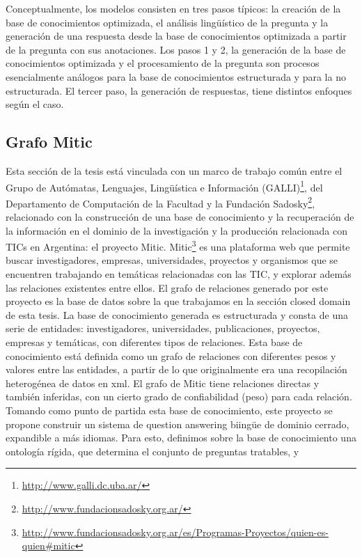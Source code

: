 Conceptualmente, los modelos consisten en tres pasos típicos: la creación de la base de conocimientos optimizada, el análisis
lingüístico de la pregunta y la generación de una respuesta desde la base de conocimientos optimizada a partir de la pregunta con sus
anotaciones. Los pasos 1 y 2, la generación de la base de conocimientos optimizada y el procesamiento de la pregunta son procesos
esencialmente análogos para la base de conocimientos estructurada y para la no estructurada. El tercer paso, la generación de respuestas,
tiene distintos enfoques según el caso. 


\subsection{Grafo Mitic}
\label{subsec:mitic}
\horrible
Esta sección de la tesis está vinculada con un marco de trabajo común entre el
Grupo de Autómatas, Lenguajes, Lingüística e Información (GALLI)\footnote{\url{http://www.galli.dc.uba.ar/}}, 
del Departamento de Computación de la Facultad y la Fundación Sadosky\footnote{\url{http://www.fundacionsadosky.org.ar/}}, relacionado con la construcción de una base de conocimiento
 y la recuperación de la información en el dominio de la investigación y la
producción relacionada con TICs en Argentina: el proyecto Mitic.
Mitic\footnote{\url{http://www.fundacionsadosky.org.ar/es/Programas-Proyectos/quien-es-quien\#mitic}} es una plataforma web que permite buscar investigadores, empresas, universidades, proyectos y organismos que se encuentren trabajando en temáticas relacionadas con las TIC, y explorar además las relaciones existentes entre ellos. El grafo de relaciones generado por este proyecto es la base de datos sobre la que trabajamos en la sección closed domain de esta tesis.
La base de conocimiento generada es estructurada y consta de
una serie de entidades: investigadores, universidades, publicaciones,
proyectos, empresas y temáticas, con diferentes tipos de relaciones.
Esta base de conocimiento está definida como un grafo de relaciones con diferentes pesos y valores entre
las entidades, a partir de lo que originalmente era una
recopilación heterogénea de datos en xml. El grafo de Mitic
tiene relaciones directas y también inferidas, con un cierto grado
de confiabilidad (peso) para cada relación. Tomando como punto de
partida esta base de conocimiento, este proyecto se propone construir
un sistema de question answering biingüe de dominio cerrado, expandible a más idiomas.
Para esto, definimos sobre la base de conocimiento una ontología
rígida, que determina el conjunto de preguntas tratables, y
